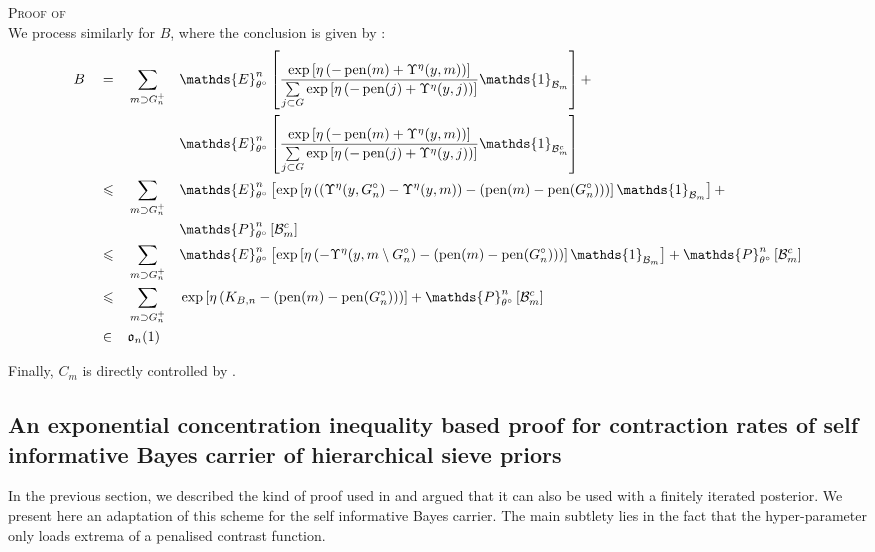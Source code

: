 \begin{pro}{\textsc{Proof of } \\}
We process similarly for $B$, where the conclusion is given by :
\begin{alignat*}{4}
& B && = && \sum\limits_{m \supset G^{+}_{n}} && \mathds{E}_{\theta^{\circ}}^{n}\left[\frac{\exp\left[\eta\left(-\pen(m) + \Upsilon^{\eta}(y, m)\right)\right]}{\sum\limits_{j \subset G}\exp\left[\eta \left(- \pen(j) + \Upsilon^{\eta}(y, j)\right)\right]} \mathds{1}_{\mathcal{B}_{m}}\right] + \\
& && && && \mathds{E}_{\theta^{\circ}}^{n}\left[\frac{\exp\left[\eta\left(-\pen(m) + \Upsilon^{\eta}(y, m)\right)\right]}{\sum\limits_{j \subset G}\exp\left[\eta \left(- \pen(j) + \Upsilon^{\eta}(y, j)\right)\right]} \mathds{1}_{\mathcal{B}_{m}^{c}}\right]\\
& && \leq && \sum\limits_{m \supset G^{+}_{n}} && \mathds{E}_{\theta^{\circ}}^{n}\left[\exp\left[\eta\left(\left(\Upsilon^{\eta}(y, G^{\circ}_{n}) - \Upsilon^{\eta}(y, m)\right) - (\pen(m) - \pen(G^{\circ}_{n}))\right)\right] \mathds{1}_{\mathcal{B}_{m}}\right] + \\
& && && && \mathds{P}_{\theta^{\circ}}^{n}\left[ \mathcal{B}_{m}^{c}\right]\\
& && \leq && \sum\limits_{m \supset G^{+}_{n}} && \mathds{E}_{\theta^{\circ}}^{n}\left[\exp\left[\eta\left(- \Upsilon^{\eta}(y, m \setminus G^{\circ}_{n}) - (\pen(m) - \pen(G^{\circ}_{n}))\right)\right] \mathds{1}_{\mathcal{B}_{m}}\right] + \mathds{P}_{\theta^{\circ}}^{n}\left[ \mathcal{B}_{m}^{c}\right]\\
& && \leq && \sum\limits_{m \supset G^{+}_{n}} && \exp\left[\eta\left(K_{B, n} - (\pen(m) - \pen(G^{\circ}_{n}))\right)\right] + \mathds{P}_{\theta^{\circ}}^{n}\left[ \mathcal{B}_{m}^{c}\right]\\
& && \in && \mathfrak{o}_{n}(1)
\end{alignat*}

\medskip

Finally, $C_{m}$ is directly controlled by .

\qedsymbol
\end{pro}

\subsection{An exponential concentration inequality based proof for contraction rates of self informative Bayes carrier of hierarchical sieve priors}\label{BAYES_STRATEGIES_EXPOLIM}

In the previous section, we described the kind of proof used in  and argued that it can also be used with a finitely iterated posterior.
We present here an adaptation of this scheme for the self informative Bayes carrier.
The main subtlety lies in the fact that the hyper-parameter only loads extrema of a penalised contrast function.

